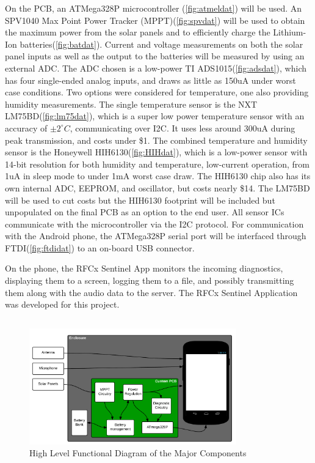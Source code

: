 \documentclass{article}
\begin{document}
{\bigskip
On the PCB, an ATMega328P microcontroller (\ref{fig:atmeldat}) will be used. An SPV1040 Max Point Power Tracker (MPPT)(\ref{fig:spvdat}) will be used to obtain the maximum power from the solar panels and to efficiently charge the Lithium-Ion batteries(\ref{fig:batdat}). Current and voltage measurements on both the solar panel inputs as well as the output to the batteries will be measured by using an external ADC. The ADC chosen is a low-power TI ADS1015(\ref{fig:adsdat}), which has four single-ended analog inputs, and draws as little as 150uA under worst case conditions. Two options were considered for temperature, one also providing humidity measurements. The single temperature sensor is the NXT LM75BD(\ref{fig:lm75dat}), which is a super low power temperature sensor with an accuracy of $\pm2^{\circ}C$, communicating over I2C. It uses less around 300uA during peak transmission, and costs under \$1. The combined temperature and humidity sensor is the Honeywell HIH6130(\ref{fig:HIHdat}), which is a low-power sensor with 14-bit resolution for both humidity and temperature, low-current operation, from 1uA in sleep mode to under 1mA worst case draw. The HIH6130 chip also has its own internal ADC, EEPROM, and oscillator, but costs nearly \$14. The LM75BD will be used to cut costs but the HIH6130 footprint will be included but unpopulated on the final PCB as an option to the end user.  All sensor ICs communicate with the microcontroller via the I2C protocol. For communication with the Android phone, the ATMega328P serial port will be interfaced through FTDI(\ref{fig:ftdidat}) to an on-board USB connector.

On the phone, the RFCx Sentinel App monitors the incoming diagnostics, displaying them to a screen, logging them to a file, and possibly transmitting them along with the audio data to the server. The RFCx Sentinel Application was developed for this project. 

\subsection{}

\begin{figure}[H]
  \centering
  \includegraphics[width=0.8\textwidth]{Highlevel}
  \caption{High Level Functional Diagram of the Major Components}
  \label{fig:hldia}
\end{figure}

}
\end{document}

